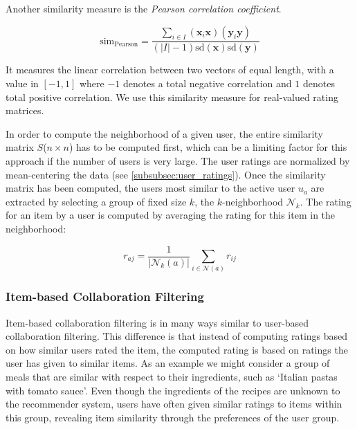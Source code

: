Another similarity measure is the \emph{Pearson correlation coefficient}.

\begin{equation}
	\mathrm{sim}_{\mathrm{Pearson}}=\frac{\sum_{i \in I}(\bm{x}_{i}\bm{x})(\bm{y}_{i}\bm{y})}{(|I|-1)\mathrm{sd}(\bm{x})\mathrm{sd}(\bm{y})}
\end{equation}

It measures the linear correlation between two vectors of equal length, with a value in $[-1,1]$ where $-1$ denotes a total negative correlation and $1$ denotes total positive correlation.
We use this similarity measure for real-valued rating matrices.

In order to compute the neighborhood of a given user, the entire similarity matrix $S$($n \times n$) has to be computed first, which can be a limiting factor for this approach if the number of users is very large.
The user ratings are normalized by mean-centering the data (see \cref{subsubsec:user_ratings}).
Once the similarity matrix has been computed, the users most similar to the active user $u_a$ are extracted by selecting a group of fixed size $k$, the $k$-neighborhood $\mathcal{N}_{k}$.
The rating for an item by a user is computed by averaging the rating for this item in the neighborhood:

\begin{equation}
	r_{aj}=\frac{1}{|\mathcal{N}_{k}(a)|}\sum_{i\in\mathcal{N}(a)}r_{ij}
\end{equation}





\subsubsection{Item-based Collaboration Filtering}
\label{subsubsec:item_based_cf}

Item-based collaboration filtering \citep{Sarwar2001} is in many ways similar to user-based collaboration filtering.
This difference is that instead of computing ratings based on how similar users rated the item, the computed rating is based on ratings the user has given to similar items.
As an example we might consider a group of meals that are similar with respect to their ingredients, such as `Italian pastas with tomato sauce'.
Even though the ingredients of the recipes are unknown to the recommender system, users have often given similar ratings to items within this group, revealing item similarity through the preferences of the user group.

